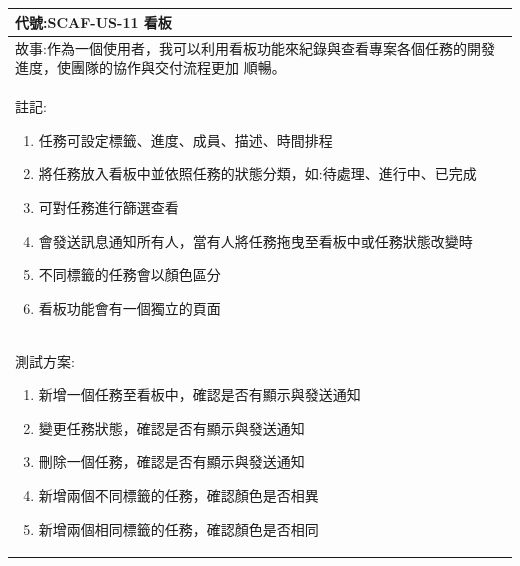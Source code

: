 \documentclass{report}
\begin{document}
\subsection*{}
\fontsize{12}{20}\selectfont
\begin{tabularx}{\textwidth}{|X|}
  \hline
  代號:SCAF-US-11 看板 \\
  \hline
  故事:作為一個使用者，我可以利用看板功能來紀錄與查看專案各個任務的開發進度，使團隊的協作與交付流程更加
  順暢。 \\
  \hline
  註記:
  \begin{enumerate}
    \item 任務可設定標籤、進度、成員、描述、時間排程
    \item 將任務放入看板中並依照任務的狀態分類，如:待處理、進行中、已完成
    \item 可對任務進行篩選查看
    \item 會發送訊息通知所有人，當有人將任務拖曳至看板中或任務狀態改變時
    \item 不同標籤的任務會以顏色區分
    \item 看板功能會有一個獨立的頁面
  \end{enumerate} \\
  \hline
  測試方案:
  \begin{enumerate}
    \item 新增一個任務至看板中，確認是否有顯示與發送通知
    \item 變更任務狀態，確認是否有顯示與發送通知
    \item 刪除一個任務，確認是否有顯示與發送通知
    \item 新增兩個不同標籤的任務，確認顏色是否相異
    \item 新增兩個相同標籤的任務，確認顏色是否相同
  \end{enumerate} \\
  \hline
\end{tabularx}
\end{document}
